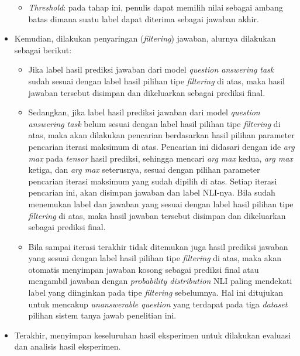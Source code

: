 \begin{itemize}
\begin{itemize}
        \item \emph{Threshold}: pada tahap ini, penulis dapat memilih nilai sebagai ambang batas dimana suatu label dapat diterima sebagai jawaban akhir.
        
    \end{itemize}
    
    \item Kemudian, dilakukan penyaringan (\emph{filtering}) jawaban, alurnya dilakukan sebagai berikut:
    
    \begin{itemize}
        
        \item Jika label hasil prediksi jawaban dari model \emph{question answering task} sudah sesuai dengan label hasil pilihan tipe \emph{filtering} di atas, maka hasil jawaban tersebut disimpan dan dikeluarkan sebagai prediksi final.
        
        \item Sedangkan, jika label hasil prediksi jawaban dari model \emph{question answering task} belum sesuai dengan label hasil pilihan tipe \emph{filtering} di atas, maka akan dilakukan pencarian berdasarkan hasil pilihan parameter pencarian iterasi maksimum di atas. Pencarian ini didasari dengan ide \emph{arg max} pada \emph{tensor} hasil prediksi, sehingga mencari \emph{arg max} kedua, \emph{arg max} ketiga, dan \emph{arg max} seterusnya, sesuai dengan pilihan parameter pencarian iterasi maksimum yang sudah dipilih di atas. Setiap iterasi pencarian ini, akan disimpan jawaban dan label NLI-nya. Bila sudah menemukan label dan jawaban yang sesuai dengan label hasil pilihan tipe \emph{filtering} di atas, maka hasil jawaban tersebut disimpan dan dikeluarkan sebagai prediksi final.
        
        \item Bila sampai iterasi terakhir tidak ditemukan juga hasil prediksi jawaban yang sesuai dengan label hasil pilihan tipe \emph{filtering} di atas, maka akan otomatis menyimpan jawaban kosong sebagai prediksi final atau mengambil jawaban dengan \emph{probability distribution} NLI paling mendekati label yang diinginkan pada tipe \emph{filtering} sebelumnya. Hal ini ditujukan untuk mencakup \emph{unanswerable question} yang terdapat pada tiga \emph{dataset} pilihan sistem tanya jawab penelitian ini.
        
    \end{itemize}
    
    \item Terakhir, menyimpan keseluruhan hasil eksperimen untuk dilakukan evaluasi dan analisis hasil eksperimen.

\end{itemize}

